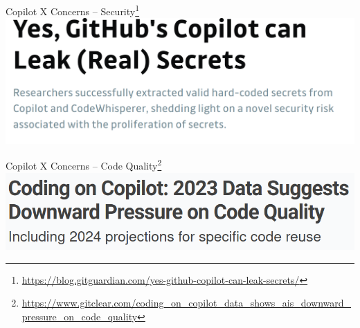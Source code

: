 \documentclass[presentation, 10pt]{beamer}\mode<presentation>{\usetheme{AMSBolognaFC}}
\begin{document}
\begin{frame}{Copilot X Concerns -- Security\footnote{\url{https://blog.gitguardian.com/yes-github-copilot-can-leak-secrets/}}}
\includegraphics[width=\textwidth]{img/copilot-concerns.png}
\end{frame}
\begin{frame}{Copilot X Concerns -- Code Quality\footnote{\url{https://www.gitclear.com/coding_on_copilot_data_shows_ais_downward_pressure_on_code_quality}}}
	\includegraphics[width=\textwidth]{img/problem-code-quality.png}
	\end{frame}
\end{document}
